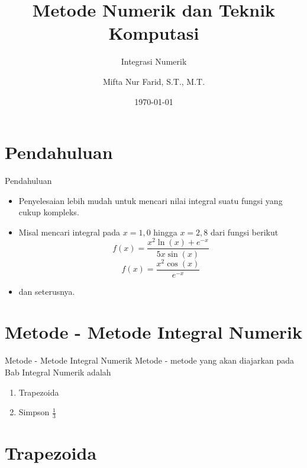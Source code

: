 \documentclass[10pt]{beamer}
\title{Metode Numerik dan Teknik Komputasi}
\subtitle{Integrasi Numerik}
\date{\today}
\author{Mifta Nur Farid, S.T., M.T.}
\institute{Teknik Elektro - Institut Teknologi Kalimantan \\ Karang Joang, Balikpapan}
\begin{document}
\maketitle


\section{Pendahuluan}

\begin{frame}[fragile]{Pendahuluan}
    \begin{itemize}[<+- | alert@+>]
        \item Penyelesaian lebih mudah untuk mencari nilai integral suatu fungsi yang cukup kompleks.
        \item Misal mencari integral pada $x=1,0$ hingga $x=2,8$ dari fungsi berikut
        $$f(x) = \frac{x^2 \ln(x) + e^{-x}}{5x \sin(x)}$$
        $$f(x) = \frac{x^2 \cos(x)}{e^{-x}}$$
        \item dan seterusnya.
    \end{itemize}
\end{frame}

\section{Metode - Metode Integral Numerik}

\begin{frame}[fragile]{Metode - Metode Integral Numerik}
    Metode - metode yang akan diajarkan pada Bab Integral Numerik adalah
    \begin{enumerate}[<+- | alert@+>]
        \item Trapezoida
        \item Simpson $\frac{1}{3}$
    \end{enumerate}
\end{frame}

\section{Trapezoida}
\end{document}
